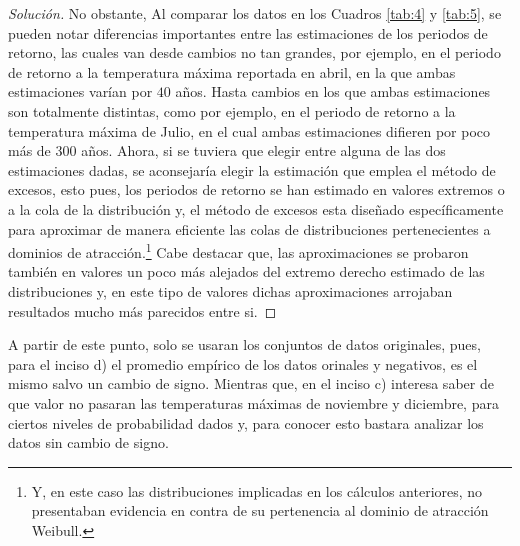 \documentclass[10.5pt,notitlepage]{article}
\renewcommand{\qedsymbol}{$\blacksquare$}
\newenvironment{solucion}
  {\begin{proof}[Solución]}
  {\end{proof}}
\theoremstyle{plain}
\newenvironment{rem}
  {\pushQED{\qed}\renewcommand{\qedsymbol}{$\triangle$}\remarkex}
  {\popQED\endremarkex}
\begin{document}
\begin{solucion}
No obstante, Al comparar los datos en los Cuadros \ref{tab:4} y \ref{tab:5}, se pueden notar diferencias importantes entre las estimaciones de los periodos de retorno, las cuales van desde cambios no tan grandes, por ejemplo, en el periodo de retorno a la temperatura máxima reportada en abril, en la que ambas estimaciones varían por \(40\) años. Hasta cambios en los que ambas estimaciones son totalmente distintas, como por ejemplo, en el periodo de retorno a la temperatura máxima de Julio, en el cual ambas estimaciones difieren por poco más de \(300\) años. Ahora, si se tuviera que elegir entre alguna de las dos estimaciones dadas, se aconsejaría elegir la estimación que emplea el método de excesos, esto pues, los periodos de retorno se han estimado en valores extremos o a la cola de la distribución y, el método de excesos esta diseñado específicamente para aproximar de manera eficiente las colas de distribuciones pertenecientes a dominios de atracción.\footnote{Y, en este caso las distribuciones implicadas en los cálculos anteriores, no presentaban evidencia en contra de su pertenencia al dominio de atracción Weibull.} Cabe destacar que, las aproximaciones se probaron también en valores un poco más alejados del extremo derecho estimado de las distribuciones y, en este tipo de valores dichas aproximaciones arrojaban resultados mucho más parecidos entre si.

\end{solucion}
\newpage


\begin{rem}
A partir de este punto, solo se usaran los conjuntos de datos originales, pues, para el inciso d) el promedio empírico de los datos orinales y negativos, es el mismo salvo un cambio de signo. Mientras que, en el inciso c) interesa saber de que valor no pasaran las temperaturas máximas de noviembre y diciembre, para ciertos niveles de probabilidad dados y, para conocer esto bastara analizar los datos sin cambio de signo.
\end{rem}
\end{document}
